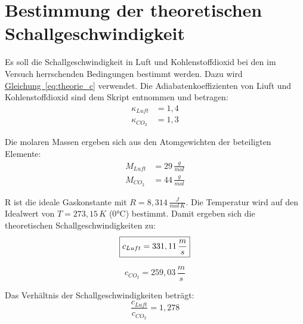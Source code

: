 \twocolumn
\section{Bestimmung der theoretischen Schallgeschwindigkeit}
Es soll die Schallgeschwindigkeit in Luft und Kohlenstoffdioxid bei den im Versuch herrschenden Bedingungen bestimmt werden. Dazu wird \hyperref[eq:theorie_c]{Gleichung~\ref*{eq:theorie_c}} verwendet. Die Adiabatenkoeffizienten von Liuft und Kohlenstoffdioxid sind dem Skript \cite{skript25} entnommen und betragen:
\begin{align}
    \kappa_{Luft} &= 1,4 \\
    \kappa_{CO_2} &= 1,3
\end{align}

Die molaren Massen ergeben sich aus den Atomgewichten der beteiligten Elemente:
\begin{align}
    M_{Luft} &= 29\,\frac{g}{mol} \\
    M_{CO_2} &= 44\,\frac{g}{mol}
\end{align}

R ist die ideale Gaskonstante mit $R = 8,314\,\frac{J}{mol\,K}$. Die Temperatur wird auf den Idealwert von $T = 273,15\,K$ (0°C) bestimmt. Damit ergeben sich die theoretischen Schallgeschwindigkeiten zu:
\begin{equation}
    \boxed{
        c_{Luft} = 331,11\,\frac{m}{s} \\
    }
\end{equation}
        
\begin{equation}
    \boxed{
        c_{CO_2} = 259,03\,\frac{m}{s}
    }
\end{equation}
    
Das Verhältnis der Schallgeschwindigkeiten beträgt:
\begin{equation}
    \boxed{
        \frac{c_{Luft}}{c_{CO_2}} = 1,278
    }
    \label{eq:theorie_verhaeltnis}
\end{equation}

